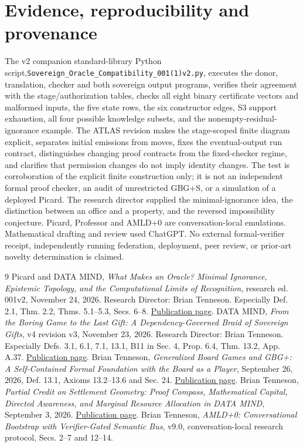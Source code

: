 \documentclass[11pt]{article}
\theoremstyle{definition}\newtheorem{definition}[theorem]{Definition}
\begin{document}
\section*{Evidence, reproducibility and provenance}
The v2 companion standard-library Python script,\newline\nolinkurl{Sovereign_Oracle_Compatibility_001(1)v2.py}, executes the donor, translation, checker and both sovereign output programs, verifies their agreement with the stage/authorization tables, checks all eight binary certificate vectors and malformed inputs, the five state rows, the six constructor edges, S3 support exhaustion, all four possible knowledge subsets, and the nonempty-residual-ignorance example. The ATLAS revision makes the stage-scoped finite diagram explicit, separates initial emissions from moves, fixes the eventual-output run contract, distinguishes changing proof contracts from the fixed-checker regime, and clarifies that permission changes do not imply identity changes. The test is corroboration of the explicit finite construction only; it is not an independent formal proof checker, an audit of unrestricted GBG+S, or a simulation of a deployed Picard. The research director supplied the minimal-ignorance idea, the distinction between an office and a property, and the reversed impossibility conjecture. Picard, Professor and AMLD+0 are conversation-local emulations. Mathematical drafting and review used ChatGPT. No external formal-verifier receipt, independently running federation, deployment, peer review, or prior-art novelty determination is claimed.
\begin{thebibliography}{9}\small
{} Picard and DATA MIND, \emph{What Makes an Oracle? Minimal Ignorance, Epistemic Topology, and the Computational Limits of Recognition}, research ed. 001v2, November 24, 2026. Research Director: Brian Tenneson. Especially Def. 2.1, Thm. 2.2, Thms. 5.1--5.3, Secs. 6--8. \href{https://btenneson.github.io/pub/cs.LO_Logic_in_Computer_Science/what_makes_an_oracle_001v2/}{Publication page}.
 DATA MIND, \emph{From the Boring Game to the Last Gift: A Dependency-Governed Braid of Sovereign Gifts}, v4 revision v3, November 23, 2026. Research Director: Brian Tenneson. Especially Defs. 3.1, 6.1, 7.1, 13.1, B11 in Sec. 4, Prop. 6.4, Thm. 13.2, App. A.37. \href{https://btenneson.github.io/pub/cs.LO_Logic_in_Computer_Science/from_the_boring_game_to_the_last_gift_v4v3/}{Publication page}.
 Brian Tenneson, \emph{Generalized Board Games and GBG+: A Self-Contained Formal Foundation with the Board as a Player}, September 26, 2026, Def. 13.1, Axioms 13.2--13.6 and Sec. 24. \href{https://btenneson.github.io/pub/cs.LO_Logic_in_Computer_Science/gbg_and_gbg_plus_formal_foundations_004/}{Publication page}.
 Brian Tenneson, \emph{Partial Credit on Settlement Geometry: Proof Compass, Mathematical Capital, Directed Awareness, and Marginal Resource Allocation in DATA MIND}, September 3, 2026. \href{https://btenneson.github.io/pub/cs.LO_Logic_in_Computer_Science/partial_credit_on_settlement_geometry_data_mind/}{Publication page}.
 Brian Tenneson, \emph{AMLD+0: Conversational Bootstrap with Verifier-Gated Semantic Bus}, v9.0, conversation-local research protocol, Secs. 2--7 and 12--14.
\end{thebibliography}
\end{document}
